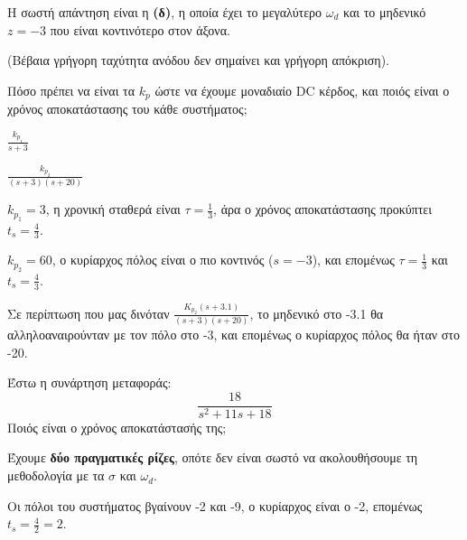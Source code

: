 \documentclass[11pt,a4paper,notitlepage,fleqn,final]{article}
\begin{document}
\begin{exercise}

Η σωστή απάντηση είναι η \textbf{(δ)}, η οποία έχει το μεγαλύτερο \( \omega_d \) και το
μηδενικό \( z=-3 \) που είναι κοντινότερο στον άξονα.

(Βέβαια γρήγορη ταχύτητα ανόδου δεν σημαίνει και γρήγορη απόκριση).

\end{exercise}
\begin{exercise}
Πόσο πρέπει να είναι τα \( k_p \) ώστε να έχουμε μοναδιαίο DC κέρδος, και ποιός είναι ο
χρόνος αποκατάστασης του κάθε συστήματος;

\begin{enumlatin}
	\item \( \displaystyle \frac{k_{p_1}}{s+3} \)
	\item \( \displaystyle \frac{k_{p_2}}{(s+3)(s+20)} \)
\end{enumlatin}

\tcblower
\begin{enumlatin}
	\item \( k_{p_1} = 3 \), η χρονική σταθερά είναι \( τ=\frac{1}{3} \), άρα
	ο χρόνος αποκατάστασης προκύπτει
	\( t_s = \frac{4}{3} \).
	\item \( k_{p_2} = 60 \), ο κυρίαρχος πόλος είναι ο πιο κοντινός (\( s=-3 \)), και
	επομένως \( τ=\frac{1}{3} \) και \( t_s = \frac{4}{3} \).
\end{enumlatin}

Σε περίπτωση που μας δινόταν \( \displaystyle \frac{K_{p_2}(s+3.1)}{(s+3)(s+20)} \), το
μηδενικό στο -3.1 θα αλληλοαναιρούνταν με τον πόλο στο -3, και επομένως ο κυρίαρχος πόλος θα
ήταν στο -20.

\end{exercise}
\begin{exercise}
Έστω η συνάρτηση μεταφοράς:
\[
\frac{18}{s^2+11s+18}
\]
Ποιός είναι ο χρόνος αποκατάστασής της;

\tcblower

\begin{attnbox}{}
	Έχουμε \textbf{δύο πραγματικές ρίζες}, οπότε δεν είναι σωστό να ακολουθήσουμε τη
	μεθοδολογία με τα \( σ \) και \( \omega_d \).
\end{attnbox}

Οι πόλοι του συστήματος βγαίνουν -2 και -9, ο κυρίαρχος είναι ο -2, επομένως \( t_s=\frac{4}{2} = 2 \).

\end{exercise}
\end{document}
